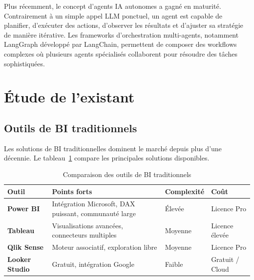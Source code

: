 Plus récemment, le concept d'agents IA autonomes a gagné en maturité. Contrairement à un simple appel LLM ponctuel, un agent est capable de planifier, d'exécuter des actions, d'observer les résultats et d'ajuster sa stratégie de manière itérative. Les frameworks d'orchestration multi-agents, notamment LangGraph développé par LangChain, permettent de composer des workflows complexes où plusieurs agents spécialisés collaborent pour résoudre des tâches sophistiquées.



\section{Étude de l'existant}

\subsection{Outils de BI traditionnels}

Les solutions de BI traditionnelles dominent le marché depuis plus d'une décennie. Le tableau~\ref{tab:bi-tools} compare les principales solutions disponibles.

\begin{table}[H]
\centering
\renewcommand{\arraystretch}{1.5} %
\caption{Comparaison des outils de BI traditionnels}
\label{tab:bi-tools}
\begin{tabularx}{\textwidth}{
    >{\bfseries}l 
    >{\raggedright\arraybackslash}X 
    >{\centering\arraybackslash}p{2.5cm} 
    >{\centering\arraybackslash}p{3cm}
}
\toprule
\textbf{Outil} & \textbf{Points forts} & \textbf{Complexité} & \textbf{Coût} \\
\midrule
Power BI      & Intégration Microsoft, DAX puissant, communauté large & Élevée  & Licence Pro     \\
Tableau       & Visualisations avancées, connecteurs multiples        & Moyenne & Licence élevée  \\
Qlik Sense    & Moteur associatif, exploration libre                  & Moyenne & Licence Pro     \\
Looker Studio & Gratuit, intégration Google                           & Faible  & Gratuit / Cloud \\
\bottomrule
\end{tabularx}
\end{table}

